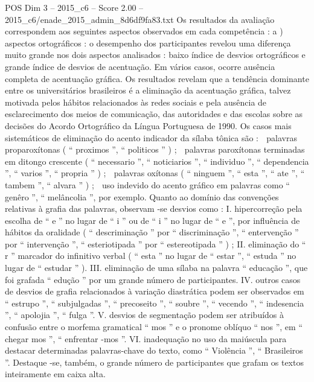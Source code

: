 \begin{textsample}{POS Dim 3 – 2015\_c6 – Score 2.00 – 2015\_c6/enade\_2015\_admin\_8d6df9fa83.txt}
Os resultados da avaliação correspondem aos seguintes aspectos observados em cada competência : a ) aspectos ortográficos : o desempenho dos participantes revelou uma diferença muito grande nos dois aspectos analisados : baixo índice de desvios ortográficos e grande índice de desvios de acentuação.
Em vários casos, ocorre ausência completa de acentuação gráfica.
Os resultados revelam que a tendência dominante entre os universitários brasileiros é a eliminação da acentuação gráfica, talvez motivada pelos hábitos relacionados às redes sociais e pela ausência de esclarecimento dos meios de comunicação, das autoridades e das escolas sobre as decisões do Acordo Ortográfico da Língua Portuguesa de 1990.
Os casos mais sistemáticos de eliminação do acento indicador da sílaba tônica são :  palavras proparoxítonas ( “ proximos ”, “ politicos ” ) ;  palavras paroxítonas terminadas em ditongo crescente ( “ necessario ”, “ noticiarios ”, “ individuo ”, “ dependencia ”, “ varios ”, “ propria ” ) ;  palavras oxítonas ( “ ninguem ”, “ esta ”, “ ate ”, “ tambem ”, “ alvara ” ) ;  uso indevido do acento gráfico em palavras como “ genêro ”, “ melâncolia ”, por exemplo.
Quanto ao domínio das convenções relativas à grafia das palavras, observam -se desvios como : I. hipercorreção pela escolha de “ e ” no lugar de “ i ” ou de “ i ” no lugar de “ e ”, por influência de hábitos da oralidade ( “ descriminação ” por “ discriminação ”, “ entervenção ” por “ intervenção ”, “ esteriotipada ” por “ estereotipada ” ) ; II. eliminação do “ r ” marcador do infinitivo verbal ( “ esta ” no lugar de “ estar ”, “ estuda ” no lugar de “ estudar ” ).
III. eliminação de uma sílaba na palavra “ educação ”, que foi grafada “ edução ” por um grande número de participantes.
IV. outros casos de desvios de grafia relacionados à variação diastrática podem ser observados em “ estrupo ”, “ subjulgadas ”, “ precoseito ”, “ soubre ”, “ vecendo ”, “ indesencia ”, “ apolojia ”, “ fulga ”.
V. desvios de segmentação podem ser atribuídos à confusão entre o morfema gramatical “ mos ” e o pronome oblíquo “ nos ”, em “ chegar mos ”, “ enfrentar -mos ”.
VI. inadequação no uso da maiúscula para destacar determinadas palavras-chave do texto, como “ Violência ”, “ Brasileiros ”.
Destaque -se, também, o grande número de participantes que grafam os textos inteiramente em caixa alta.

\end{textsample}
